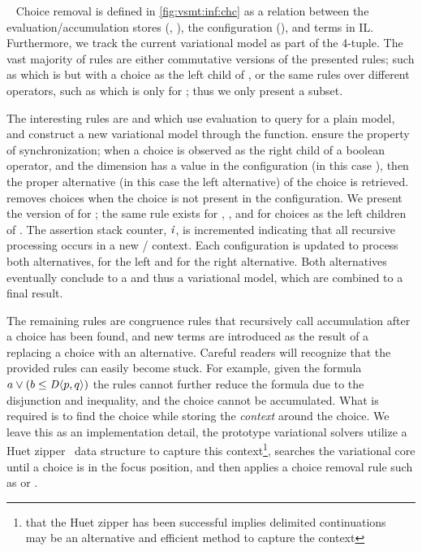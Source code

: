 ~\label{section:vsmt:choice-removal}
%
Choice removal is defined in \autoref{fig:vsmt:inf:chc} as a relation between
the evaluation/accumulation stores (\aStore{}, \eStore{}), the configuration
(\configuration{}), and terms in IL\@. Furthermore, we track the current
variational model as part of the 4-tuple. The vast majority of rules are either
commutative versions of the presented rules; such as  which is
 but with a choice as the left child of \boolFuncs{}, or the same
rules over different operators, such as  which is 
only for \inequalities{}; thus we only present a subset.

The interesting rules are  and  which use evaluation to
query for a plain model, and construct a new variational model through the
 function.  ensure the property of
synchronization; when a choice is observed as the right child of a boolean
operator, and the dimension has a value in the configuration (in this case
\true{}), then the proper alternative (in this case the left alternative) of the
choice is retrieved.  removes choices when the choice is not
present in the configuration. We present the version of  for
\inequalities{}; the same rule exists for \boolFuncs{}, \integerFuncs{}, and for
choices as the left children of \inequalities{}. The assertion stack counter,
$\mathit{i}$, is incremented indicating that all recursive processing occurs in a
new / context. Each configuration is updated to process
both alternatives, \true{} for the left and \false{} for the right alternative.
Both alternatives eventually conclude to a \unit{} and thus a variational model,
which are combined to a final result.

The remaining rules are congruence rules that recursively call accumulation
after a choice has been found, and new terms are introduced as the result of a
replacing a choice with an alternative. Careful readers will recognize that the
provided rules can easily become stuck. For example, given the formula $a \vee{}
(b \leq{} \chc[D]{p,q})$ the rules cannot further reduce the formula due to the
disjunction and inequality, and the choice cannot be accumulated. What is
required is to find the choice while storing the \emph{context} around the
choice. We leave this as an implementation detail, the prototype variational
solvers utilize a Huet zipper~\cite{huet_1997} data structure to capture this
context\footnote{that the Huet zipper has been successful implies delimited
  continuations~ may be an alternative and efficient method to
  capture the context}, searches the variational core until a choice is in the
focus position, and then applies a choice removal rule such as
 or .



